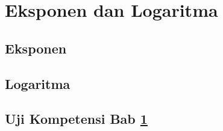 \chapter{Eksponen dan Logaritma}
\label{sec:fourth}
\kant[15-19] %
\section{Eksponen}
\kant[1-4]
\section{Logaritma}
\kant[5-8]
\section{Uji Kompetensi Bab \ref{sec:fourth}}
\kant[9-12]